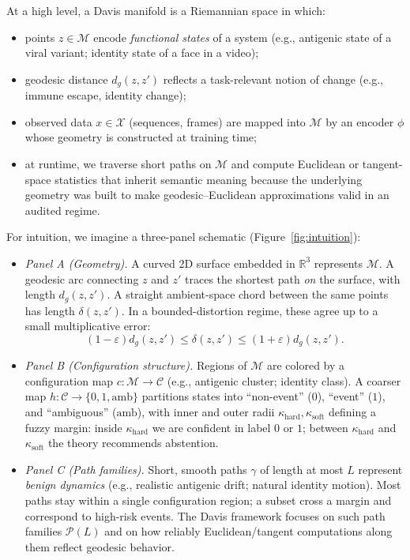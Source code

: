 \documentclass[11pt]{article}
\begin{document}
At a high level, a Davis manifold is a Riemannian space in which:
\begin{itemize}
    \item points $z \in \mathcal{M}$ encode \emph{functional states} of a system (e.g., antigenic
    state of a viral variant; identity state of a face in a video);
    \item geodesic distance $d_g(z,z')$ reflects a task-relevant notion of change
    (e.g., immune escape, identity change);
    \item observed data $x \in \mathcal{X}$ (sequences, frames) are mapped into $\mathcal{M}$
    by an encoder $\phi$ whose geometry is constructed at training time;
    \item at runtime, we traverse short paths on $\mathcal{M}$ and compute Euclidean or
    tangent-space statistics that inherit semantic meaning because the underlying geometry
    was built to make geodesic--Euclidean approximations valid in an audited regime.
\end{itemize}

For intuition, we imagine a three-panel schematic (Figure~\ref{fig:intuition}):

\begin{itemize}
    \item \emph{Panel A (Geometry).} A curved 2D surface embedded in $\mathbb{R}^3$ represents
    $\mathcal{M}$. A geodesic arc connecting $z$ and $z'$ traces the shortest path \emph{on}
    the surface, with length $d_g(z,z')$. A straight ambient-space chord between the same
    points has length $\delta(z,z')$. In a bounded-distortion regime, these agree up to a
    small multiplicative error:
    \[
        (1-\varepsilon) d_g(z,z') \le \delta(z,z') \le (1+\varepsilon) d_g(z,z').
    \]

    \item \emph{Panel B (Configuration structure).} Regions of $\mathcal{M}$ are colored
    by a configuration map $c:\mathcal{M} \to \mathcal{C}$ (e.g., antigenic cluster;
    identity class). A coarser map $h:\mathcal{C} \to \{0,1,\mathrm{amb}\}$ partitions
    states into ``non-event'' ($0$), ``event'' ($1$), and ``ambiguous'' ($\mathrm{amb}$),
    with inner and outer radii $\kappa_{\mathrm{hard}},\kappa_{\mathrm{soft}}$ defining
    a fuzzy margin: inside $\kappa_{\mathrm{hard}}$ we are confident in label $0$ or $1$;
    between $\kappa_{\mathrm{hard}}$ and $\kappa_{\mathrm{soft}}$ the theory recommends
    abstention.

    \item \emph{Panel C (Path families).} Short, smooth paths $\gamma$ of length at most
    $L$ represent \emph{benign dynamics} (e.g., realistic antigenic drift; natural identity
    motion). Most paths stay within a single configuration region; a subset cross a margin
    and correspond to high-risk events. The Davis framework focuses on such path families
    $\mathcal{P}(L)$ and on how reliably Euclidean/tangent computations along them reflect
    geodesic behavior.
\end{itemize}
\end{document}
